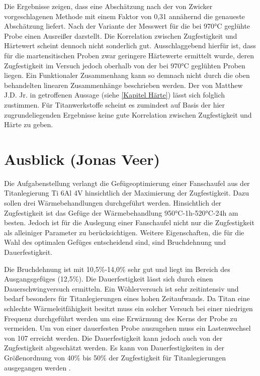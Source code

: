 \documentclass[a4paper, 11pt]{tubsreprt}
\begin{document}
Die Ergebnisse zeigen, dass eine Abschätzung nach der von Zwicker vorgeschlagenen Methode mit einem Faktor von 0,31 annähernd die genaueste Abschätzung liefert. Nach der Variante der Messwert für die bei 970°C geglühte Probe einen Ausreißer darstellt. Die Korrelation zwischen Zugfestigkeit und Härtewert scheint dennoch nicht sonderlich gut. Ausschlaggebend hierfür ist, dass für die martensitischen Proben zwar geringere Härtewerte ermittelt wurde, deren Zugfestigkeit im Versuch jedoch oberhalb von der bei 970°C geglühten Proben liegen. Ein Funktionaler Zusammenhang kann so demnach nicht durch die oben behandelten linearen Zusammenhänge beschrieben werden. Der von Matthew J.D. Jr. in \cite{Donachie2001} getroffenen Aussage (siehe \ref{Kapitel Härte}) lässt sich folglich zustimmen. Für Titanwerkstoffe scheint es zumindest auf Basis der hier zugrundeliegenden Ergebnisse keine gute Korrelation zwischen Zugfestigkeit und Härte zu geben.
\chapter{Ausblick (Jonas Veer)}
Die Aufgabenstellung verlangt die Gefügeoptimierung einer Fanschaufel aus der Titanlegierung Ti 6Al 4V hinsichtlich der Maximierung der Zugfestigkeit. Dazu sollen drei Wärmebehandlungen durchgeführt werden. Hinsichtlich der Zugfestigkeit ist das Gefüge der Wärmebehandlung 950°C-1h-520°C-24h am besten.
Jedoch ist für die Auslegung einer Fanschaufel nicht nur die Zugfestigkeit als alleiniger Parameter zu berücksichtigen. Weitere Eigenschaften, die für die Wahl des optimalen Gefüges entscheidend sind, sind Bruchdehnung und Dauerfestigkeit.

Die Bruchdehnung ist mit 10,5\%-14,0\% sehr gut und liegt im Bereich des Ausgangsgefüges (12,5\%). 
Die Dauerfestigkeit lässt sich durch einen Dauerschwingversuch ermitteln. Ein Wöhlerversuch ist sehr zeitintensiv und bedarf besonders für Titanlegierungen eines hohen Zeitaufwands. Da Titan eine schlechte Wärmeleitfähigkeit besitzt muss ein solcher Versuch bei einer niedrigen Frequenz durchgeführt werden um eine Erwärmung des Kerns der Probe zu vermeiden. Um von einer dauerfesten Probe auszugehen muss ein Lastenwechsel von 107 erreicht werden.
Die Dauerfestigkeit kann jedoch auch von der Zugfestigkeit abgeschätzt werden. Es kann von Dauerfestigkeiten in der Größenordnung von 40\% bis 50\% der Zugfestigkeit für Titanlegierungen ausgegangen werden \cite{Luetjering2007}.
\end{document}
